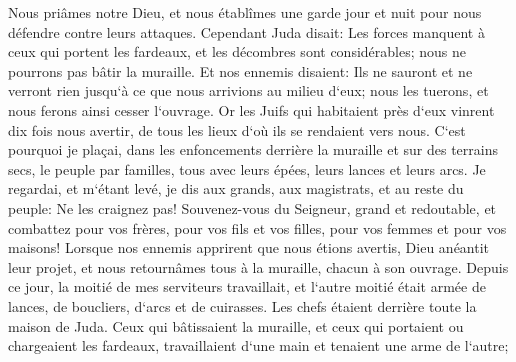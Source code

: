 \verse Nous priâmes notre Dieu, et nous établîmes une garde jour et nuit pour nous défendre contre leurs attaques. 
\verse Cependant Juda disait: Les forces manquent à ceux qui portent les fardeaux, et les décombres sont considérables; nous ne pourrons pas bâtir la muraille. 
\verse Et nos ennemis disaient: Ils ne sauront et ne verront rien jusqu`à ce que nous arrivions au milieu d`eux; nous les tuerons, et nous ferons ainsi cesser l`ouvrage. 
\verse Or les Juifs qui habitaient près d`eux vinrent dix fois nous avertir, de tous les lieux d`où ils se rendaient vers nous. 
\verse C`est pourquoi je plaçai, dans les enfoncements derrière la muraille et sur des terrains secs, le peuple par familles, tous avec leurs épées, leurs lances et leurs arcs. 
\verse Je regardai, et m`étant levé, je dis aux grands, aux magistrats, et au reste du peuple: Ne les craignez pas! Souvenez-vous du Seigneur, grand et redoutable, et combattez pour vos frères, pour vos fils et vos filles, pour vos femmes et pour vos maisons! 
\verse Lorsque nos ennemis apprirent que nous étions avertis, Dieu anéantit leur projet, et nous retournâmes tous à la muraille, chacun à son ouvrage. 
\verse Depuis ce jour, la moitié de mes serviteurs travaillait, et l`autre moitié était armée de lances, de boucliers, d`arcs et de cuirasses. Les chefs étaient derrière toute la maison de Juda. 
\verse Ceux qui bâtissaient la muraille, et ceux qui portaient ou chargeaient les fardeaux, travaillaient d`une main et tenaient une arme de l`autre; 
